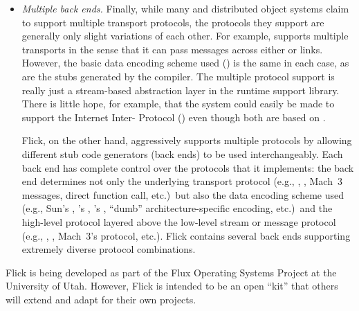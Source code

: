 \begin{itemize}
  \item \emph{Multiple back ends.}
  Finally, while many \RPC{} and distributed object systems claim to support
  multiple transport protocols, the protocols they support are generally only
  slight variations of each other.  For example, \ONCRPC{} supports multiple
  transports in the sense that it can pass messages across either \TCP{} or
  \UDP{} links.  However, the basic data encoding scheme used (\XDR{}) is the
  same in each case, as are the stubs generated by the \IDL{} compiler.  The
  multiple protocol support is really just a stream-based abstraction layer in
  the \RPC{} runtime support library.  There is little hope, for example, that
  the \ONCRPC{} system could easily be made to support the \CORBA{} Internet
  Inter-\ORB{} Protocol (\IIOP{}) even though both are based on \TCP{}\@.

  Flick, on the other hand, aggressively supports multiple protocols by
  allowing different stub code generators (back ends) to be used
  interchangeably.  Each back end has complete control over the \RPC{}
  protocols that it implements: the back end determines not only the underlying
  transport protocol (e.g., \TCP{}, \UDP{}, Mach~3 messages, direct function
  call, etc.)\ but also the data encoding scheme used (e.g., Sun's \XDR{},
  \DCE{}'s \NDR{}, \CORBA{}'s \CDR{}, ``dumb'' architecture-specific encoding,
  etc.)\ and the high-level \RPC{} protocol layered above the low-level stream
  or message protocol (e.g., \ONCRPC{}, \CORBA{} \IIOP{}, Mach~3's \MIG{}
  protocol, etc.).  Flick contains several back ends supporting extremely
  diverse protocol combinations.
\end{itemize}

Flick is being developed as part of the Flux Operating Systems Project at the
University of Utah.  However, Flick is intended to be an open ``kit'' that
others will extend and adapt for their own projects.



